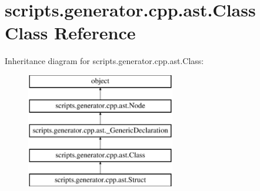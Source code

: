 \hypertarget{classscripts_1_1generator_1_1cpp_1_1ast_1_1_class}{}\section{scripts.\+generator.\+cpp.\+ast.\+Class Class Reference}
\label{classscripts_1_1generator_1_1cpp_1_1ast_1_1_class}
Inheritance diagram for scripts.\+generator.\+cpp.\+ast.\+Class\+:\begin{figure}[H]
\begin{center}
\leavevmode
\includegraphics[height=5.000000cm]{d5/d04/classscripts_1_1generator_1_1cpp_1_1ast_1_1_class}
\end{center}
\end{figure}
